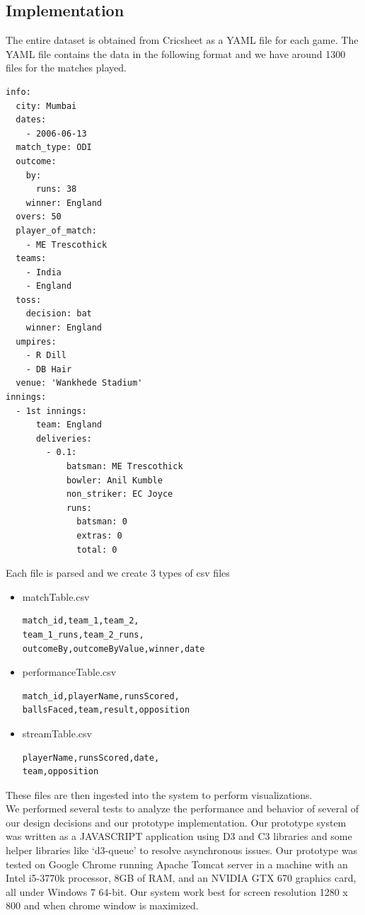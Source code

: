 \documentclass[10pt,journal,compsoc]{IEEEtran}
\begin{document}
\subsection {Implementation}
The entire dataset is obtained from Cricsheet\cite{cricsheet} as a YAML file for each game. The YAML file contains the data in the following format and we have around 1300 files for the matches played.
\begin{verbatim}
info:
  city: Mumbai
  dates:
    - 2006-06-13
  match_type: ODI
  outcome:
    by:
      runs: 38
    winner: England
  overs: 50
  player_of_match:
    - ME Trescothick
  teams:
    - India
    - England
  toss:
    decision: bat
    winner: England
  umpires:
    - R Dill
    - DB Hair
  venue: 'Wankhede Stadium'
innings:
  - 1st innings:
      team: England
      deliveries:
        - 0.1:
            batsman: ME Trescothick
            bowler: Anil Kumble
            non_striker: EC Joyce
            runs:
              batsman: 0
              extras: 0
              total: 0
\end{verbatim}
Each file is parsed and we create 3 types of csv files
\begin{itemize}
\item matchTable.csv
\begin{verbatim}
match_id,team_1,team_2,
team_1_runs,team_2_runs,
outcomeBy,outcomeByValue,winner,date
\end{verbatim}
\item performanceTable.csv
\begin{verbatim}
match_id,playerName,runsScored,
ballsFaced,team,result,opposition
\end{verbatim}
\item streamTable.csv
\begin{verbatim}
playerName,runsScored,date,
team,opposition
\end{verbatim}
\end{itemize}
These files are then ingested into the system to perform visualizations.\\

\indent We  performed  several  tests  to  analyze  the performance  and  behavior  of  several  of  our  design decisions   and   our   prototype   implementation.   Our
prototype  system  was  written  as  a  JAVASCRIPT application using D3\cite{d3} and C3\cite{c3} libraries and some helper libraries like `d3-queue'\cite{q} to resolve asynchronous issues.  Our prototype was tested on Google Chrome running Apache Tomcat server in a  machine  with  an  Intel  i5-3770k  processor,  8GB  of RAM,  and  an  NVIDIA  GTX  670  graphics  card,  all under Windows 7 64-bit. Our system work best for screen resolution 1280 x 800 and when chrome window is maximized.
\end{document}
